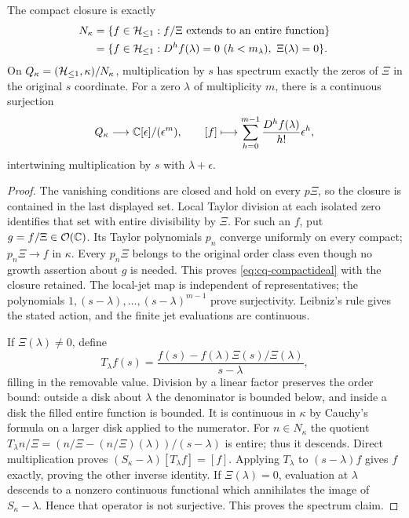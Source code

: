 \begin{cqtheorem}
\label{thm:cq-compact}
The compact closure is exactly
\begin{equation}\label{eq:cq-compactideal}
 \begin{aligned}
 N_\kappa
 &=\{f\in\mathcal H_{\leq 1}:f/\Xi\text{ extends to an entire function}\}\\
 &=\{f\in\mathcal H_{\leq 1}:D^hf(\lambda)=0\ (h<m_\lambda),\ \Xi(\lambda)=0\}.
 \end{aligned}
\end{equation}
On $Q_\kappa=(\mathcal H_{\leq 1},\kappa)/N_\kappa$, multiplication by $s$ has
spectrum exactly the zeros of $\Xi$ in the original $s$ coordinate.
For a zero $\lambda$ of multiplicity $m$, there is a continuous
surjection
\[
 Q_\kappa\longrightarrow\mathbb C[\epsilon]/(\epsilon^m),\qquad
 [f]\longmapsto\sum_{h=0}^{m-1}\frac{D^hf(\lambda)}{h!}\epsilon^h,
\]
intertwining multiplication by $s$ with $\lambda+\epsilon$.
\end{cqtheorem}
\begin{proof}
The vanishing conditions are closed and hold on every $p\Xi$,
so the closure is contained in the last displayed set. Local Taylor
division at each isolated zero identifies that set with entire
divisibility by $\Xi$. For such an $f$, put $g=f/\Xi\in\mathcal O(\mathbb C)$.
Its Taylor polynomials $p_n$ converge uniformly on every compact;
$p_n\Xi\to f$ in $\kappa$. Every $p_n\Xi$ belongs to the original
order class even though no growth assertion about $g$ is needed.
This proves \eqref{eq:cq-compactideal} with the closure retained.
The local-jet map is independent of representatives; the polynomials
$1,(s-\lambda),\ldots,(s-\lambda)^{m-1}$ prove surjectivity.
Leibniz's rule gives the stated action, and the finite jet evaluations
are continuous.

If $\Xi(\lambda)\ne0$, define
\[
 T_\lambda f(s)=
 \frac{f(s)-f(\lambda)\Xi(s)/\Xi(\lambda)}{s-\lambda},
\]
filling in the removable value. Division by a linear factor preserves
the order bound: outside a disk about $\lambda$ the denominator is
bounded below, and inside a disk the filled entire function is bounded.
It is continuous in $\kappa$ by Cauchy's formula on a larger disk
applied to the numerator. For $n\in N_\kappa$ the quotient
$T_\lambda n/\Xi=(n/\Xi-(n/\Xi)(\lambda))/(s-\lambda)$ is entire;
thus it descends. Direct multiplication proves
$(S_\kappa-\lambda)[T_\lambda f]=[f]$.
Applying $T_\lambda$ to $(s-\lambda)f$ gives $f$ exactly, proving
the other inverse identity. If $\Xi(\lambda)=0$, evaluation at
$\lambda$ descends to a nonzero continuous functional which annihilates
the image of $S_\kappa-\lambda$. Hence that operator is not
surjective. This proves the spectrum claim.
\end{proof}


